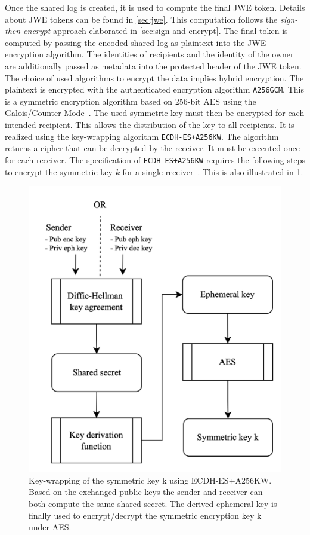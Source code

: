 \documentclass[../main.tex]{subfiles}
\begin{document}
Once the  shared log is created, it is used to compute the final JWE token.
Details about JWE tokens can be found in \cref{sec:jwe}.
This computation follows the \emph{sign-then-encrypt} approach elaborated in \cref{sec:sign-and-encrypt}.
The final token is computed by passing the encoded shared log as plaintext into the JWE encryption algorithm.
The identities of recipients and the identity of the owner are additionally passed as metadata into the protected header of the JWE token.
The choice of used algorithms to encrypt the data implies hybrid encryption.
The plaintext is encrypted with the authenticated encryption algorithm \verb|A256GCM|.
This is a symmetric encryption algorithm based on 256-bit AES using the Galois/Counter-Mode~\cite{JWA2015}.
The used symmetric key must then be encrypted for each intended recipient.
This allows the distribution of the key to all recipients.
It is realized using the key-wrapping algorithm \verb|ECDH-ES+A256KW|.
The algorithm returns a cipher that can be decrypted by the receiver.
It must be executed once for each receiver.
The specification of \verb|ECDH-ES+A256KW| requires the following steps to encrypt the symmetric key $k$ for a single receiver~\cite[100]{Barker2017}.
This is also illustrated in \cref{fig:key_wrapping}.
\begin{figure}[ht]
    \includegraphics[scale=0.2]{../img/05/key_wrapping.png}
    \centering
    \caption[Key-wrapping ECDH-ES+A256KW]{
        Key-wrapping of the symmetric key k using ECDH-ES+A256KW.
        Based on the exchanged public keys the sender and receiver can both compute the same shared secret.
        The derived ephemeral key is finally used to encrypt/decrypt the symmetric encryption key k under AES.}
    \label{fig:key_wrapping}
\end{figure}
\end{document}
